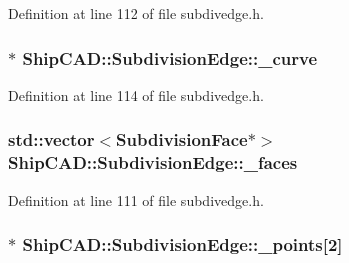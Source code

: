 Definition at line 112 of file subdivedge.\-h.

\hypertarget{classShipCAD_1_1SubdivisionEdge_a1863a7ef84b2d73f0e1407f3536bbc9f}{
\subsubsection[{\-\_\-curve}]{$\ast$ Ship\-C\-A\-D\-::\-Subdivision\-Edge\-::\-\_\-curve\hspace{0.3cm}{\ttfamily [protected]}}}\label{classShipCAD_1_1SubdivisionEdge_a1863a7ef84b2d73f0e1407f3536bbc9f}


Definition at line 114 of file subdivedge.\-h.

\hypertarget{classShipCAD_1_1SubdivisionEdge_aa1da730fcb3ac49c92e803a0b336d855}{
\subsubsection[{\-\_\-faces}]{\setlength{\rightskip}{0pt plus 5cm}std\-::vector$<${\bf Subdivision\-Face}$\ast$$>$ Ship\-C\-A\-D\-::\-Subdivision\-Edge\-::\-\_\-faces\hspace{0.3cm}{\ttfamily [protected]}}}\label{classShipCAD_1_1SubdivisionEdge_aa1da730fcb3ac49c92e803a0b336d855}


Definition at line 111 of file subdivedge.\-h.

\hypertarget{classShipCAD_1_1SubdivisionEdge_a55519f9d615d6bd701c10c48259525ac}{
\subsubsection[{\-\_\-points}]{$\ast$ Ship\-C\-A\-D\-::\-Subdivision\-Edge\-::\-\_\-points\mbox{[}2\mbox{]}\hspace{0.3cm}{\ttfamily [protected]}}}\label{classShipCAD_1_1SubdivisionEdge_a55519f9d615d6bd701c10c48259525ac}


